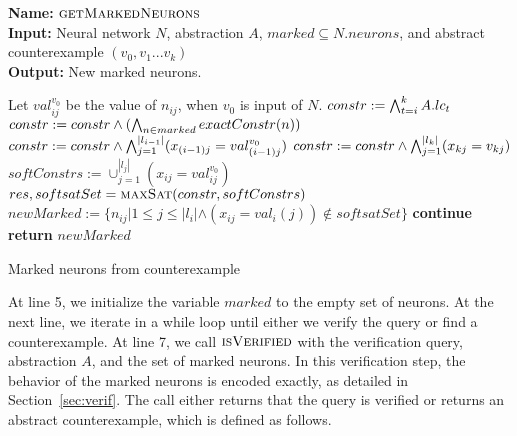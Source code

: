 \begin{algorithm}[t]
  \textbf{Name: } $\textsc{getMarkedNeurons}$ \\
  \textbf{Input: } Neural network $N$, \deeppoly{} abstraction $A$, $marked\subseteq N.neurons$, and abstract counterexample $({v_0}, {v_1} ... {v_k})$\\
  \textbf{Output: } New marked neurons. 
  \begin{algorithmic}[1]
    \State Let ${val^{v_0}_{ij}}$ be the value of $n_{ij}$, when ${v_0}$ is input of $N$. 
     
        \State $constr := \bigwedge_{t=i}^k A.lc_t$
        \State $constr := constr \land (\bigwedge_{n \in marked} exactConstr(n))$ 
        \State $constr := constr \land \bigwedge_{j=1}^{|l_{i-1}|} (x_{(i-1)j} = val^{v_0}_{(i-1)j})$
        \State $constr := constr \land \bigwedge_{j=1}^{|l_k|} (x_{kj} = v_{kj})$
        \State $softConstrs := \cup_{j=1}^{|l_j|} (x_{ij} = val^{v_0}_{ij})$
        \State $res, softsatSet = \textsc{maxSat}{}(constr, softConstrs)$ 
        \State $newMarked := \{n_{ij} | 1 \leq j \leq |l_i| \land (x_{ij} = val_i(j)) \notin  softsatSet\}$ 
          \State \textbf{continue}
        \Else
          \State \textbf{return} $newMarked$
        \EndIf 
      \EndIf
    \EndFor
  \end{algorithmic}
  \caption{Marked neurons from counterexample}
  \label{algo:refine2}
\end{algorithm}

At line 5, we initialize the variable $marked$ to the empty set of neurons.  At the next line, we iterate in a while loop until 
either we verify the query or find a counterexample. At line 7, we call $\textsc{isVerified}$ with the verification query, 
abstraction $A$, and the set of marked neurons. In this verification step, the behavior of the marked neurons is encoded exactly, 
as detailed in Section~\ref{sec:verif}. The call either returns that the query is verified or returns an abstract counterexample, 
which is defined as follows.


